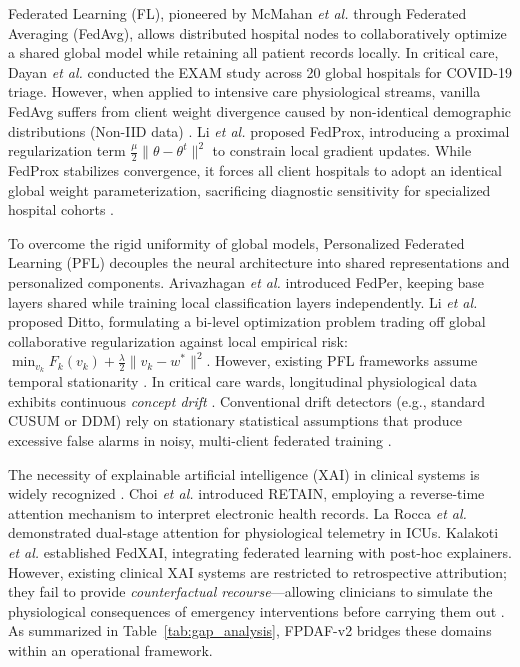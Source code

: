 \documentclass[final,5p,times,twocolumn]{elsarticle}
\begin{document}
Federated Learning (FL), pioneered by McMahan \textit{et al.} \cite{mcmahan2017} through Federated Averaging (FedAvg), allows distributed hospital nodes to collaboratively optimize a shared global model while retaining all patient records locally. In critical care, Dayan \textit{et al.} \cite{dayan2021exam} conducted the EXAM study across 20 global hospitals for COVID-19 triage. However, when applied to intensive care physiological streams, vanilla FedAvg suffers from client weight divergence caused by non-identical demographic distributions (Non-IID data) \cite{li2020fedprox,tang2025horizon}. Li \textit{et al.} \cite{li2020fedprox} proposed FedProx, introducing a proximal regularization term $\frac{\mu}{2} \|\theta - \theta^t\|^2$ to constrain local gradient updates. While FedProx stabilizes convergence, it forces all client hospitals to adopt an identical global weight parameterization, sacrificing diagnostic sensitivity for specialized hospital cohorts \cite{arivazhagan2020,wang2025personalized}.

To overcome the rigid uniformity of global models, Personalized Federated Learning (PFL) decouples the neural architecture into shared representations and personalized components. Arivazhagan \textit{et al.} \cite{arivazhagan2020} introduced FedPer, keeping base layers shared while training local classification layers independently. Li \textit{et al.} \cite{li2021ditto} proposed Ditto, formulating a bi-level optimization problem trading off global collaborative regularization against local empirical risk: $\min_{v_k} F_k(v_k) + \frac{\lambda}{2} \|v_k - w^*\|^2$. However, existing PFL frameworks assume temporal stationarity \cite{wang2025personalized,yuan2024trend}. In critical care wards, longitudinal physiological data exhibits continuous \textit{concept drift} \cite{jothimurugesan2022,bernardi2023adaptive}. Conventional drift detectors (e.g., standard CUSUM or DDM) rely on stationary statistical assumptions that produce excessive false alarms in noisy, multi-client federated training \cite{bernardi2023adaptive}.

The necessity of explainable artificial intelligence (XAI) in clinical systems is widely recognized \cite{lundberg2018explainable,sundararajan2017axiomatic}. Choi \textit{et al.} \cite{choi2016retain} introduced RETAIN, employing a reverse-time attention mechanism to interpret electronic health records. La Rocca \textit{et al.} \cite{larocca2021attention} demonstrated dual-stage attention for physiological telemetry in ICUs. Kalakoti \textit{et al.} \cite{kalakoti2025fedxai} established FedXAI, integrating federated learning with post-hoc explainers. However, existing clinical XAI systems are restricted to retrospective attribution; they fail to provide \textit{counterfactual recourse}---allowing clinicians to simulate the physiological consequences of emergency interventions before carrying them out \cite{larocca2022shap}. As summarized in Table~\ref{tab:gap_analysis}, FPDAF-v2 bridges these domains within an operational framework.
\end{document}
